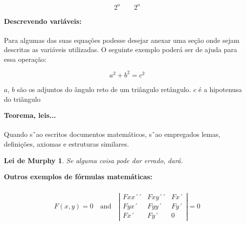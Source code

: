 \documentclass[a4paper, 12pt]{article} %
\begin{document}
\begin{equation}
2^\textrm{o} \qquad 2^\mathrm{o}
\end{equation}

\begin{flushleft}
\textbf{Descrevendo variáveis:}
\end{flushleft}

\paragraph{} Para algumas das suas equações podesse desejar anexar uma seção onde sejam descritas as variáveis utilizadas. O seguinte exemplo poderá ser de ajuda para essa operação:

\begin{displaymath}
a^2+b^2=c^2
\end{displaymath}

{\settowidth{\parindent}{onde:\ } $a$, $b$ são os adjuntos do ângulo reto de um triângulo retângulo. $c$ é a hipotenusa do triângulo}

\begin{flushleft}
\textbf{Teorema, leis...}
\end{flushleft}

\paragraph{} Quando s˜ao escritos documentos matemáticos, s˜ao empregados lemas, definições, axiomas e estruturas similares. 

\newtheorem{mur} {Lei de Murphy}[section]
\begin{mur} Se alguma coisa pode dar errado, dará.
\end{mur}

\begin{flushleft}
\textbf{Outros exemplos de fórmulas matemáticas:}
\end{flushleft}

\subparagraph{}
\begin{displaymath}
{F}(x,y)=0\quad\mathrm{and}
\quad \left| \begin{array}{ccc}
F {xx}´´ & F {xy}´´ & F {x}´ \\
F {yx}´ & F {yy}´ & F {y}´ \\
F {x}´ & F {y}´ & 0
\end{array} \right| = 0
\end{displaymath}

\subparagraph{} 
\end{document}
